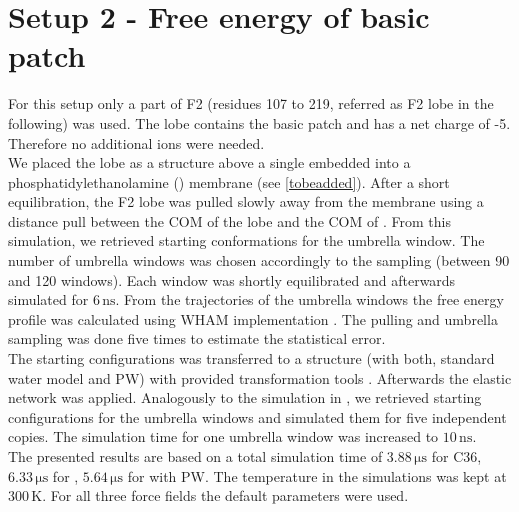 \section{Setup 2 - Free energy of basic patch}
\label{setup:setup2}
For this setup only a part of F2 (residues 107 to 219, referred as F2 lobe in the following) was used. The lobe contains the basic patch and has a net charge of -5. Therefore no additional ions were needed.\\
We placed the lobe as a \charmm{} structure above a single \pip{} embedded into a phosphatidylethanolamine (\pope{}) membrane (see \autoref{tobeadded}). After a short equilibration, the F2 lobe was pulled slowly away from the membrane using a distance pull between the COM of the lobe and the COM of \pip{}. From this simulation, we retrieved starting conformations for the umbrella window. The number of umbrella windows was chosen accordingly to the sampling (between 90 and 120 windows). Each window was shortly equilibrated and afterwards simulated for $6\,\si{\nano\second}$.  From the trajectories of the umbrella windows the free energy profile was calculated using \gromacs{} WHAM implementation \autocite{gromacsWHAM}. The pulling and umbrella sampling was done five times to estimate the statistical error.\\
The starting configurations was transferred to a \martini{} structure (with both, standard water model and PW) with provided transformation tools \autocite{backward.py}. Afterwards the elastic network was applied. Analogously to the simulation in \charmm{}, we retrieved starting configurations for the umbrella windows and simulated them for five independent copies. The simulation time for one umbrella window was increased to $10\,\si{\nano\second}$.\\
The presented results are based on a total simulation time of $3.88\,\si{\micro\second}$ for C36, $6.33\,\si{\micro\second}$ for \martini{}, $5.64\,\si{\micro\second}$ for \martini{} with PW. The temperature in the simulations was kept at $300\,\si{\kelvin}$. For all three force fields the default parameters were used.
%
%
%
